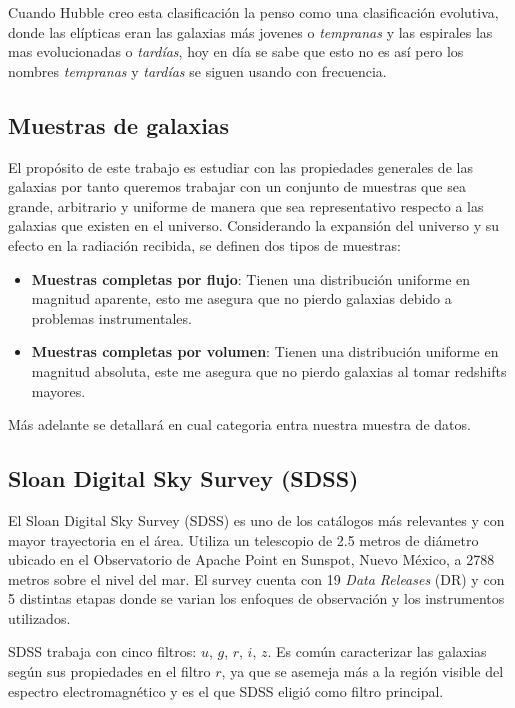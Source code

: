 \documentclass{article}
\begin{document}
Cuando Hubble creo esta clasificación la penso como una clasificación evolutiva, donde las elípticas eran las galaxias más jovenes o \textit{tempranas} y las espirales las mas evolucionadas o \textit{tardías}, hoy en día se sabe que esto no es así pero los nombres \textit{tempranas} y \textit{tardías} se siguen usando con frecuencia.

\subsection{Muestras de galaxias}
El propósito de este trabajo es estudiar con las propiedades generales de las galaxias por tanto queremos trabajar con un conjunto de muestras que sea grande, arbitrario y uniforme de manera que sea representativo respecto a las galaxias que existen en el universo. Considerando la expansión del universo y su efecto en la radiación recibida, se definen dos tipos de muestras: 

\begin{itemize} 
	\item \textbf{Muestras completas por flujo}: Tienen una distribución uniforme en magnitud aparente, esto me asegura que no pierdo galaxias debido a problemas instrumentales.
    \item \textbf{Muestras completas por volumen}: Tienen una distribución uniforme en magnitud absoluta, este me asegura que no pierdo galaxias al tomar redshifts mayores.
\end{itemize}

Más adelante se detallará en cual categoria entra nuestra muestra de datos.


\subsection{Sloan Digital Sky Survey (SDSS)}

El Sloan Digital Sky Survey (SDSS) es uno de los catálogos más relevantes y con mayor trayectoria en el área. Utiliza un telescopio de 2.5 metros de diámetro ubicado en el Observatorio de Apache Point en Sunspot, Nuevo México, a 2788 metros sobre el nivel del mar. El survey cuenta con 19 \textit{Data Releases} (DR) y con 5 distintas etapas donde se varian los enfoques de observación y los instrumentos utilizados.

SDSS trabaja con cinco filtros: $u$, $g$, $r$, $i$, $z$. Es común caracterizar las galaxias según sus propiedades en el filtro $r$, ya que se asemeja más a la región visible del espectro electromagnético y es el que SDSS eligió como filtro principal.
\end{document}

